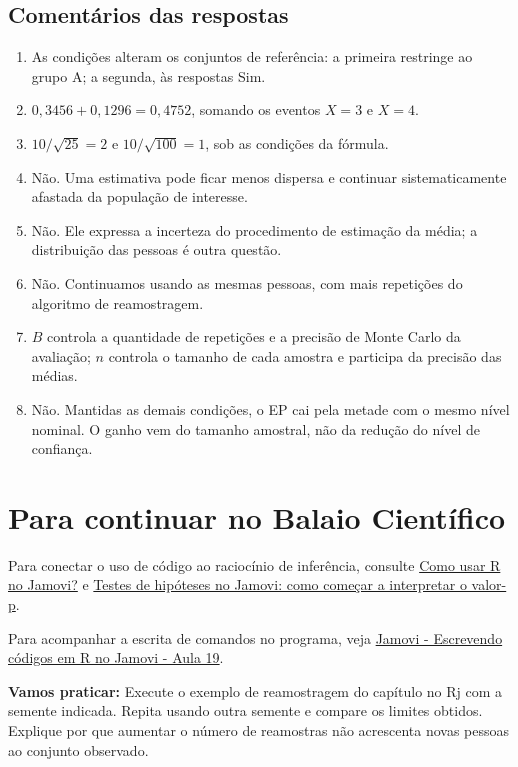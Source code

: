 \subsection*{Comentários das respostas}

\begin{enumerate}
  \item As condições alteram os conjuntos de referência: a primeira restringe ao grupo A; a segunda, às respostas Sim.
  \item $0{,}3456+0{,}1296=0{,}4752$, somando os eventos $X=3$ e $X=4$.
  \item $10/\sqrt{25}=2$ e $10/\sqrt{100}=1$, sob as condições da fórmula.
  \item Não. Uma estimativa pode ficar menos dispersa e continuar sistematicamente afastada da população de interesse.
  \item Não. Ele expressa a incerteza do procedimento de estimação da média; a distribuição das pessoas é outra questão.
  \item Não. Continuamos usando as mesmas pessoas, com mais repetições do algoritmo de reamostragem.
  \item $B$ controla a quantidade de repetições e a precisão de Monte Carlo da avaliação; $n$ controla o tamanho de cada amostra e participa da precisão das médias.
  \item Não. Mantidas as demais condições, o EP cai pela metade com o mesmo nível nominal. O ganho vem do tamanho amostral, não da redução do nível de confiança.
\end{enumerate}

\section{Para continuar no Balaio Científico}

Para conectar o uso de código ao raciocínio de inferência, consulte \href{https://www.balaiocientifico.com/2025/04/como-usar-r-no-jamovi.html}{Como usar R no Jamovi?} e \href{https://www.balaiocientifico.com/2026/10/testes-de-hipoteses-no-jamovi-como.html}{Testes de hipóteses no Jamovi: como começar a interpretar o valor-p}.

Para acompanhar a escrita de comandos no programa, veja \href{https://www.youtube.com/watch?v=TsnW7xN6Wfs}{Jamovi - Escrevendo códigos em R no Jamovi - Aula 19}.

\textbf{Vamos praticar:} Execute o exemplo de reamostragem do capítulo no Rj com a semente indicada. Repita usando outra semente e compare os limites obtidos. Explique por que aumentar o número de reamostras não acrescenta novas pessoas ao conjunto observado.
